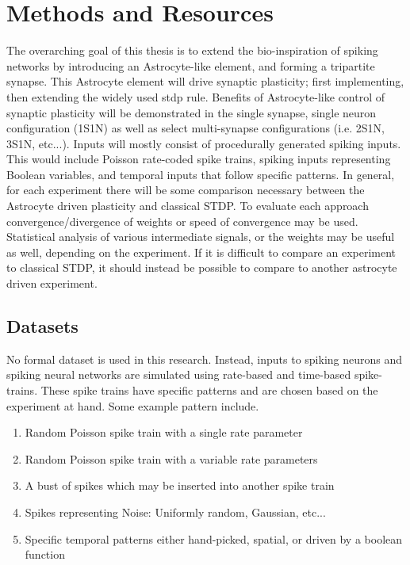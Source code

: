 %
%


\chapter{Methods and Resources} \label{section:methods}
    The overarching goal of this thesis is to extend the bio-inspiration of
    spiking networks by introducing an Astrocyte-like element, and forming a
    tripartite synapse. This Astrocyte element will drive synaptic plasticity;
    first implementing, then extending the widely used \gls{stdp} rule. Benefits of
    Astrocyte-like control of synaptic plasticity will be demonstrated in the
    single synapse, single neuron configuration (1S1N) as well as select
    multi-synapse configurations (i.e. 2S1N, 3S1N, etc...). Inputs will mostly
    consist of procedurally generated spiking inputs. This would include Poisson
    rate-coded spike trains, spiking inputs representing Boolean variables, and
    temporal inputs that follow specific patterns. In general, for each
    experiment there will be some comparison necessary between the Astrocyte
    driven plasticity and classical STDP. To evaluate each approach
    convergence/divergence of weights or speed of convergence may be
    used. Statistical analysis of various intermediate signals, or the weights
    may be useful as well, depending on the experiment. If it is difficult to
    compare an experiment to classical STDP, it should instead be possible to
    compare to another astrocyte driven experiment.

    \section{Datasets} \label{section:datasets}
    No formal dataset is used in this research. Instead, inputs to spiking
    neurons and spiking neural networks are simulated using rate-based and
    time-based spike-trains. These spike trains have specific patterns and are
    chosen based on the experiment at hand. Some example pattern include.
    \begin{enumerate}
    \item Random Poisson spike train with a single rate parameter
    \item Random Poisson spike train with a variable rate parameters
    \item A bust of spikes which may be inserted into another spike train
    \item Spikes representing Noise: Uniformly random, Gaussian, etc...
    \item Specific temporal patterns either hand-picked, spatial, or driven by a
      boolean function
    \end{enumerate}
        
